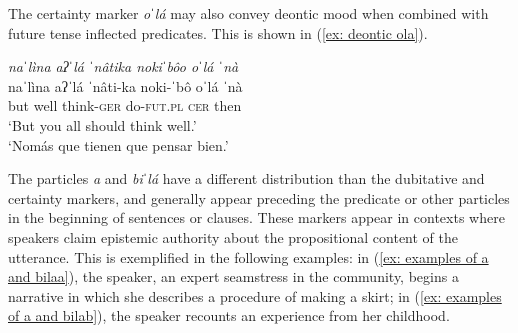 The certainty marker \textit{oˈlá} may also convey deontic mood when combined with future tense inflected predicates. This is shown in (\ref{ex: deontic ola}).

\ea\label{ex: deontic ola}

    \textit{naˈlìna aʔˈlá ˈnâtika nokiˈbôo oˈlá ˈnà}\\
    \gll    naˈlìna aʔˈlá ˈnâti-ka noki-ˈbô oˈlá ˈnà\\
            but well think-\textsc{ger} do-\textsc{fut.pl} \textsc{cer} then\\
    \glt    ‘But you all should think well.’\\
    \glt    ‘Nomás que tienen que pensar bien.’ \\

\z

The particles \textit{a} and  \textit{biˈlá} have a different distribution than the dubitative and certainty markers, and generally appear preceding the predicate or other particles in the beginning of sentences or clauses. These markers appear in contexts where speakers claim epistemic authority about the propositional content of the utterance. This is exemplified in the following examples: in (\ref{ex: examples of a and bilaa}), the speaker, an expert seamstress in the community, begins a narrative in which she describes a procedure of making a skirt; in (\ref{ex: examples of a and bilab}), the speaker recounts an experience from her childhood.


\ea\label{ex: examples of a and bila}

    \label{ex: examples of a and bilaa}
        \label{ex: examples of a and bilab}

